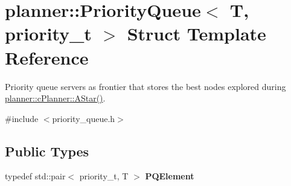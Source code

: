 \hypertarget{structplanner_1_1_priority_queue}{}\section{planner\+:\+:Priority\+Queue$<$ T, priority\+\_\+t $>$ Struct Template Reference}
\label{structplanner_1_1_priority_queue}


Priority queue servers as frontier that stores the best nodes explored during \mbox{\hyperlink{classplanner_1_1c_planner_a341e70531266f023ac9461d18979d1ef}{planner\+::c\+Planner\+::\+A\+Star()}}.  




{\ttfamily \#include $<$priority\+\_\+queue.\+h$>$}

\subsection*{Public Types}
\begin{DoxyCompactItemize}
\item 
\mbox{\label{structplanner_1_1_priority_queue_ae0445a3c85c4e139fcf28479a800f019}} 
typedef std\+::pair$<$ priority\+\_\+t, T $>$ {\bfseries P\+Q\+Element}
\end{DoxyCompactItemize}
